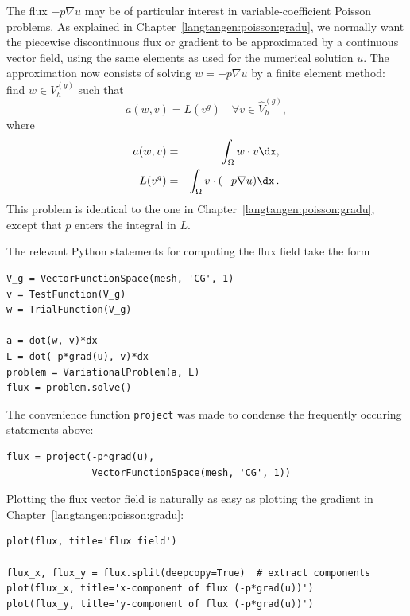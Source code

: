 The flux $-p\nabla u$ may be of particular interest in variable-coefficient
Poisson
problems. As explained in Chapter~\ref{langtangen:poisson:gradu},
we normally want the piecewise discontinuous flux or gradient
to be approximated by a continuous vector field, using the same elements
as used for the numerical solution $u$. The approximation now consists of
solving $w = -p\nabla u$ by a finite element method:
find $w\in V^{(g)}_h$ such that
\begin{equation}
a(w, v) = L(v^{g})\quad\forall v\in \hat{V}_h^{(g)},
\end{equation}
where
\begin{eqnarray}
a(w, v) &=& \int_\Omega w\cdot v\dx,\\
L(v^{g}) &=& \int_\Omega v\cdot (-p \nabla u)\dx\langtangenep
\end{eqnarray}
This problem is identical to the one in Chapter~\ref{langtangen:poisson:gradu},
except that $p$ enters the integral in $L$.

The relevant Python statements for computing the flux field take the form
\begin{Verbatim}[fontsize=\fontsize{10pt}{10pt},tabsize=8,baselinestretch=1.05,
fontfamily=tt,xleftmargin=7mm]
V_g = VectorFunctionSpace(mesh, 'CG', 1)
v = TestFunction(V_g)
w = TrialFunction(V_g)

a = dot(w, v)*dx
L = dot(-p*grad(u), v)*dx
problem = VariationalProblem(a, L)
flux = problem.solve()
\end{Verbatim}
\noindent
The convenience function {\fontsize{12pt}{12pt}\texttt{project}} was made to condense the frequently
occuring statements above:
\begin{Verbatim}[fontsize=\fontsize{10pt}{10pt},tabsize=8,baselinestretch=1.05,
fontfamily=tt,xleftmargin=7mm]
flux = project(-p*grad(u),
               VectorFunctionSpace(mesh, 'CG', 1))
\end{Verbatim}
\noindent

Plotting the flux vector field is naturally as easy as plotting
the gradient in Chapter~\ref{langtangen:poisson:gradu}:
\begin{Verbatim}[fontsize=\fontsize{10pt}{10pt},tabsize=8,baselinestretch=1.05,
fontfamily=tt,xleftmargin=7mm]
plot(flux, title='flux field')

flux_x, flux_y = flux.split(deepcopy=True)  # extract components
plot(flux_x, title='x-component of flux (-p*grad(u))')
plot(flux_y, title='y-component of flux (-p*grad(u))')
\end{Verbatim}
\noindent

